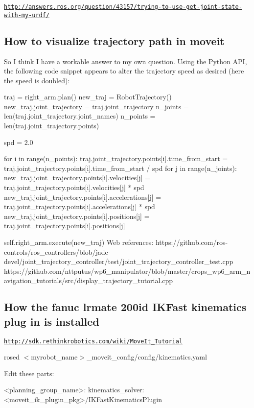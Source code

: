 \href{http://answers.ros.org/question/43157/trying-to-use-get-joint-state-with-my-urdf/}{\tt http\-://answers.\-ros.\-org/question/43157/trying-\/to-\/use-\/get-\/joint-\/state-\/with-\/my-\/urdf/}

\subsection*{How to visualize trajectory path in moveit }

So I think I have a workable answer to my own question. Using the Python A\-P\-I, the following code snippet appears to alter the trajectory speed as desired (here the speed is doubled)\-: \begin{DoxyVerb}     traj = right_arm.plan()
     new_traj = RobotTrajectory()
     new_traj.joint_trajectory = traj.joint_trajectory
     n_joints = len(traj.joint_trajectory.joint_names)
     n_points = len(traj.joint_trajectory.points)

     spd = 2.0

     for i in range(n_points):
         traj.joint_trajectory.points[i].time_from_start =
traj.joint_trajectory.points[i].time_from_start / spd
         for j in range(n_joints):
new_traj.joint_trajectory.points[i].velocities[j] =
traj.joint_trajectory.points[i].velocities[j] * spd
new_traj.joint_trajectory.points[i].accelerations[j] =
traj.joint_trajectory.points[i].accelerations[j] * spd
new_traj.joint_trajectory.points[i].positions[j] =
traj.joint_trajectory.points[i].positions[j]

     self.right_arm.execute(new_traj) 
Web references:
https://github.com/ros-controls/ros_controllers/blob/jade-devel/joint_trajectory_controller/test/joint_trajectory_controller_test.cpp
https://github.com/nttputus/wp6_manipulator/blob/master/crops_wp6_arm_navigation_tutorials/src/display_trajectory_tutorial.cpp
\end{DoxyVerb}


\subsection*{How the fanuc lrmate 200id I\-K\-Fast kinematics plug in is installed }

\href{http://sdk.rethinkrobotics.com/wiki/MoveIt_Tutorial}{\tt http\-://sdk.\-rethinkrobotics.\-com/wiki/\-Move\-It\-\_\-\-Tutorial}

rosed $<$myrobot\-\_\-name$>$\-\_\-moveit\-\_\-config/config/kinematics.\-yaml

Edit these parts\-: \begin{DoxyVerb}<planning_group_name>:
  kinematics_solver: <moveit_ik_plugin_pkg>/IKFastKinematicsPlugin
\end{DoxyVerb}


